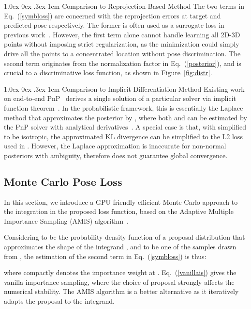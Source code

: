 \documentclass[10pt,twocolumn,letterpaper]{article}
\makeatletter
\renewcommand{\paragraph}{
  \@startsection{paragraph}{4}
  {\z@}{1.0ex \@plus 0ex \@minus .3ex}{-1em}
  {\normalfont\normalsize\bfseries}
}
\makeatother
\begin{document}
\paragraph{Comparison to Reprojection-Based Method}
The two terms in Eq.~(\ref{symbloss}) are concerned with the reprojection errors at target and predicted pose respectively. The former is often used as a surrogate loss in previous work~\cite{BPnP, dsac++, monorun}. However, the first term alone cannot handle learning all 2D-3D points without imposing strict regularization, as the minimization could simply drive all the points to a concentrated location without pose discrimination. The second term originates from the normalization factor in Eq.~(\ref{posterior}), and is crucial to a discriminative loss function, as shown in Figure~\ref{fig:distr}.

\paragraph{Comparison to Implicit Differentiation Method} 
Existing work on end-to-end PnP~\cite{BPnP, blindpnp}
derives a single solution of a particular solver  via implicit function theorem~\cite{declarative}. In the probabilistic framework, this is essentially the Laplace method that approximates the posterior by , where both  and  can be estimated by the PnP solver with analytical derivatives~\cite{monorun}. 
A special case is that, with  simplified to be isotropic, the approximated KL divergence can be simplified to the L2 loss  used in \cite{blindpnp}. However, the Laplace approximation is inaccurate for non-normal posteriors with ambiguity, therefore does not guarantee global convergence.

\subsection{Monte Carlo Pose Loss} \label{mcloss}

In this section, we introduce a GPU-friendly efficient Monte Carlo approach to the integration in the proposed loss function, based on the Adaptive Multiple Importance Sampling (AMIS) algorithm~\cite{amis}.


Considering  to be the probability density function of a proposal distribution that approximates the shape of the integrand , and  to be one of the  samples drawn from , the estimation of the second term  in Eq.~(\ref{symbloss}) is thus:

where  compactly denotes the importance weight at . Eq.~(\ref{vanillais}) gives the vanilla importance sampling, where the choice of proposal  strongly affects the numerical stability. The AMIS algorithm is a better alternative as it iteratively adapts the proposal to the integrand. 
\end{document}
